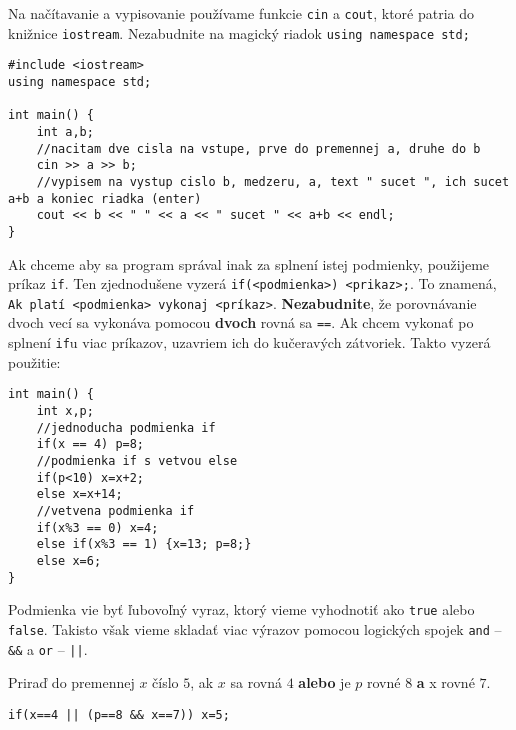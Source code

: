 
Na načítavanie a vypisovanie používame funkcie \texttt{cin} a \texttt{cout}, ktoré patria do
knižnice \texttt{iostream}. Nezabudnite na magický riadok \texttt{using namespace std;}

\begin{lstlisting}
#include <iostream>
using namespace std;

int main() {
    int a,b;
    //nacitam dve cisla na vstupe, prve do premennej a, druhe do b
    cin >> a >> b;
    //vypisem na vystup cislo b, medzeru, a, text " sucet ", ich sucet a+b a koniec riadka (enter)
    cout << b << " " << a << " sucet " << a+b << endl;
}
\end{lstlisting}


Ak chceme aby sa program správal inak za splnení istej podmienky, použijeme príkaz \texttt{if}. Ten
zjednodušene vyzerá \texttt{if(<podmienka>) <prikaz>;}. To znamená, \texttt{Ak platí <podmienka>
vykonaj <príkaz>}. \textbf{Nezabudnite}, že porovnávanie dvoch vecí sa vykonáva pomocou \textbf{dvoch}
rovná sa \texttt{==}. Ak chcem vykonať po splnení \texttt{if}u viac príkazov, uzavriem ich do
kučeravých zátvoriek. Takto vyzerá použitie:

\begin{lstlisting}
int main() {
    int x,p;
    //jednoducha podmienka if
    if(x == 4) p=8;
    //podmienka if s vetvou else
    if(p<10) x=x+2;
    else x=x+14;
    //vetvena podmienka if
    if(x%3 == 0) x=4;
    else if(x%3 == 1) {x=13; p=8;}
    else x=6;
}
\end{lstlisting}

Podmienka vie byť ľubovoľný vyraz, ktorý vieme vyhodnotiť ako \texttt{true} alebo \texttt{false}.
Takisto však vieme skladať viac výrazov pomocou logických spojek \texttt{and} -- \texttt{\&\&} a
\texttt{or} -- \texttt{||}.

Priraď do premennej $x$ číslo $5$, ak $x$ sa rovná $4$ \textbf{alebo} je $p$ rovné $8$ \textbf{a} x
rovné $7$.
\begin{lstlisting}
if(x==4 || (p==8 && x==7)) x=5;
\end{lstlisting}


